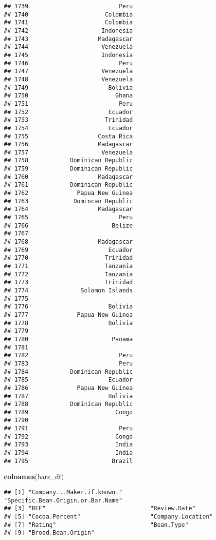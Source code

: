 \documentclass[
]{article}
\newenvironment{Shaded}{\begin{snugshade}}{\end{snugshade}}
\newcommand{\FunctionTok}[1]{\textcolor[rgb]{0.13,0.29,0.53}{\textbf{#1}}}
\newcommand{\NormalTok}[1]{#1}
\begin{document}
\begin{verbatim}
## 1739                          Peru
## 1740                      Colombia
## 1741                      Colombia
## 1742                     Indonesia
## 1743                    Madagascar
## 1744                     Venezuela
## 1745                     Indonesia
## 1746                          Peru
## 1747                     Venezuela
## 1748                     Venezuela
## 1749                       Bolivia
## 1750                         Ghana
## 1751                          Peru
## 1752                       Ecuador
## 1753                      Trinidad
## 1754                       Ecuador
## 1755                    Costa Rica
## 1756                    Madagascar
## 1757                     Venezuela
## 1758            Dominican Republic
## 1759            Dominican Republic
## 1760                    Madagascar
## 1761            Dominican Republic
## 1762              Papua New Guinea
## 1763             Domincan Republic
## 1764                    Madagascar
## 1765                          Peru
## 1766                        Belize
## 1767                              
## 1768                    Madagascar
## 1769                       Ecuador
## 1770                      Trinidad
## 1771                      Tanzania
## 1772                      Tanzania
## 1773                      Trinidad
## 1774               Solomon Islands
## 1775                              
## 1776                       Bolivia
## 1777              Papua New Guinea
## 1778                       Bolivia
## 1779                              
## 1780                        Panama
## 1781                              
## 1782                          Peru
## 1783                          Peru
## 1784            Dominican Republic
## 1785                       Ecuador
## 1786              Papua New Guinea
## 1787                       Bolivia
## 1788            Dominican Republic
## 1789                         Congo
## 1790                              
## 1791                          Peru
## 1792                         Congo
## 1793                         India
## 1794                         India
## 1795                        Brazil
\end{verbatim}

\begin{Shaded}
\begin{Highlighting}[]
  \FunctionTok{colnames}\NormalTok{(bars\_df)}
\end{Highlighting}
\end{Shaded}

\begin{verbatim}
## [1] "Company...Maker.if.known."        "Specific.Bean.Origin.or.Bar.Name"
## [3] "REF"                              "Review.Date"                     
## [5] "Cocoa.Percent"                    "Company.Location"                
## [7] "Rating"                           "Bean.Type"                       
## [9] "Broad.Bean.Origin"
\end{verbatim}
\end{document}
